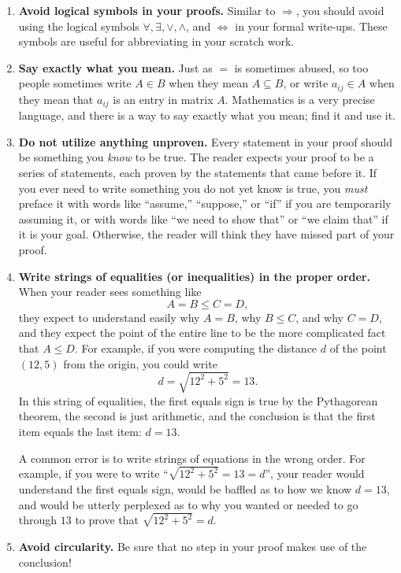 \documentclass[11pt]{article}
\newcommand{\logeq}{\Longleftrightarrow}
\renewcommand{\implies}{\Longrightarrow}
\begin{document}
\begin{enumerate}
\item \textbf{Avoid logical symbols in your proofs.}  
Similar to $\implies$, you should avoid using the logical symbols $\forall, \exists, \vee, \wedge$, and $\logeq$ in your formal write-ups.  These symbols are useful for abbreviating in your scratch work. 

\item \textbf{Say exactly what you mean.}
Just as $=$ is sometimes abused, so too people sometimes write $A\in B$ when they mean $A\subseteq B$, or write $a_{ij}\in A$ when they mean that $a_{ij}$ is an entry in matrix $A$. Mathematics is a very precise language, and there is a way to say exactly what you mean; find it and use it.

\item \textbf{Do not utilize anything unproven.}
Every statement in your proof should be something you \emph{know} to be true. The reader expects your proof to be a series of statements, each proven by the statements that came before it. If you ever need to write something you do not yet know is true, you \emph{must} preface it with words like ``assume,'' ``suppose,'' or ``if'' if you are temporarily assuming it, or with words like ``we need to show that'' or ``we claim that'' if it is your goal. Otherwise, the reader will think they have missed part of your proof.

\item \textbf{Write strings of equalities (or inequalities) in the proper order.}
When your reader sees something like
\[
A=B\leq C=D,
\]
they expect to understand easily why $A=B$, why $B\leq C$, and why $C=D$, and they expect the point of the entire line to be the more complicated fact that $A\leq D$. For example, if you were computing the distance $d$ of the point $(12,5)$ from the origin, you could write
\[
d = \sqrt{12^2+5^2} = 13.
\]
In this string of equalities, the first equals sign is true by the Pythagorean theorem, the second is just arithmetic, and the conclusion is that the first item equals the last item: $d=13$.
        
A common error is to write strings of equations in the wrong order. For example, if you were to write ``$\sqrt{12^2+5^2}=13=d$'', your reader would understand the first equals sign, would be baffled as to how we know $d=13$, and would be utterly perplexed as to why you wanted or needed to go through $13$ to prove that $\sqrt{12^2+5^2}=d$.

\item \textbf{Avoid circularity.}  Be sure that no step in your proof makes use of the conclusion!
        

\end{enumerate}
\end{document}
